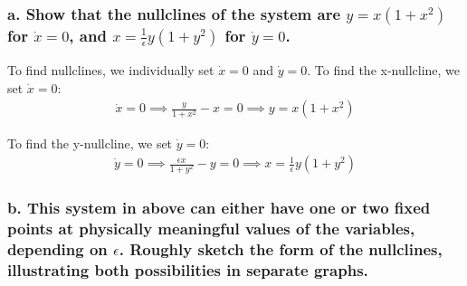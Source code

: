 \documentclass[12pt]{article}
\begin{document}
\subsubsection*{a. Show that the nullclines of the system are
    $y = x(1 + x^2)$ for $\dot{x} = 0$, and
    $x = \frac{1}{\epsilon} y(1 + y^2)$ for $\dot{y} = 0$.}

To find nullclines, we individually set $\dot{x} = 0$ and $\dot{y} = 0$. To
find the x-nullcline, we set $\dot{x} = 0$:
\begin{align*}
    \dot{x} = 0 \implies \frac{y}{1 + x^2} - x = 0 \implies y = x(1 + x^2)
\end{align*}

To find the y-nullcline, we set $\dot{y} = 0$:
\begin{align*}
    \dot{y} = 0 \implies \frac{\epsilon x}{1 + y^2} - y = 0 \implies x = \frac{1}{\epsilon} y(1 + y^2)
\end{align*}

\subsubsection*{b. This system in above can either have one or two fixed points at physically meaningful values of the variables,
    depending on $\epsilon$. Roughly sketch the form of the nullclines, illustrating both possibilities in separate graphs.}
\end{document}
